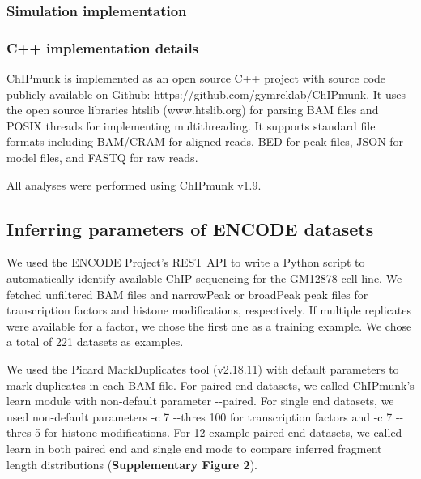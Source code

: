 \documentclass[12pt]{article}
\begin{document}
\subsubsection*{Simulation implementation}





\subsubsection*{C++ implementation details}
ChIPmunk is implemented as an open source C++ project with source code publicly available on Github: https://github.com/gymreklab/ChIPmunk.
It uses the open source libraries htslib (www.htslib.org) for parsing BAM files and POSIX threads for implementing multithreading.
It supports standard file formats including BAM/CRAM for aligned reads, BED for peak files, JSON for model files, and FASTQ for raw reads.

All analyses were performed using ChIPmunk v1.9. %

\subsection*{Inferring parameters of ENCODE datasets}

We used the ENCODE Project's REST API to write a Python script to automatically identify available ChIP-sequencing for the GM12878 cell line.
We fetched unfiltered BAM files and narrowPeak or broadPeak peak files for transcription factors and histone modifications, respectively.
If multiple replicates were available for a factor, we chose the first one as a training example.
We chose a total of 221 datasets as examples.

We used the Picard \cite{picard} MarkDuplicates tool (v2.18.11) with default parameters to mark duplicates in each BAM file.
For paired end datasets, we called ChIPmunk's learn module with non-default parameter -{}-paired.
For single end datasets, we used non-default parameters -c 7 -{}-thres 100 for transcription factors and -c 7 -{}-thres 5 for histone modifications.
For 12 example paired-end datasets, we called learn in both paired end and single end mode to compare inferred fragment length distributions (\textbf{Supplementary Figure 2}).
\end{document}
